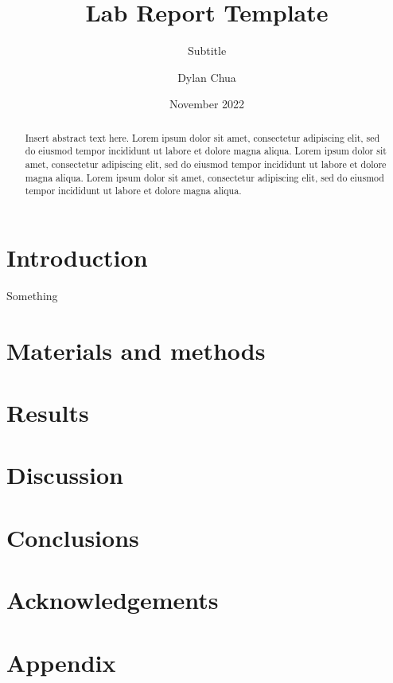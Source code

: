 \documentclass[12pt, draft]{labreport}
\title{Lab Report Template}
\subtitle{Subtitle}
\author{Dylan Chua}
\date{November 2022}
\begin{document}
\frontmatter
\titlepage

\begin{abstract}
    Insert abstract text here. Lorem ipsum dolor sit amet, consectetur adipiscing elit, sed do eiusmod tempor incididunt ut labore et dolore magna aliqua. Lorem ipsum dolor sit amet, consectetur adipiscing elit, sed do eiusmod tempor incididunt ut labore et dolore magna aliqua. Lorem ipsum dolor sit amet, consectetur adipiscing elit, sed do eiusmod tempor incididunt ut labore et dolore magna aliqua.
\end{abstract}
\newpage

\tableofcontents
\newpage

\begin{nomen}
    

\end{nomen}
\newpage


\mainmatter
\section{Introduction}
Something \cite{Bayer_etal_2013}

\section{Materials and methods}

\section{Results}

\section{Discussion}

\section{Conclusions}

\section{Acknowledgements}



\backmatter
\section{Appendix}
\end{document}
